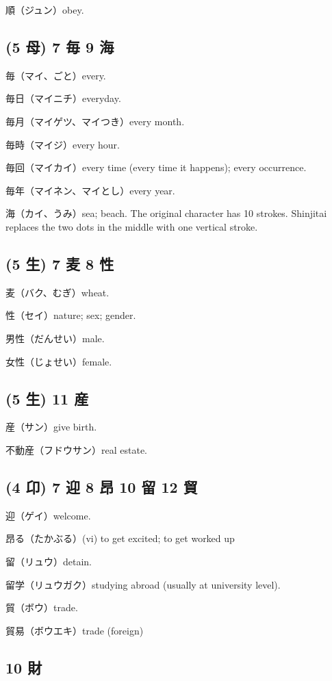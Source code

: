 順（ジュン）obey.

\subsection{(5 母) 7 毎 9 海}

毎（マイ、ごと）every.

毎日（マイニチ）everyday.

毎月（マイゲツ、マイつき）every month.

毎時（マイジ）every hour.

毎回（マイカイ）every time (every time it happens); every occurrence.

毎年（マイネン、マイとし）every year.

海（カイ、うみ）sea; beach.
The original character has 10 strokes.
Shinjitai replaces the two dots in the middle
with one vertical stroke.

\subsection{(5 生) 7 麦 8 性}

麦（バク、むぎ）wheat.

性（セイ）nature; sex; gender.

男性（だんせい）male.

女性（じょせい）female.

\subsection{(5 生) 11 産}

産（サン）give birth.

不動産（フドウサン）real estate.

\subsection{(4 卬) 7 迎 8 昂 10 留 12 貿}

迎（ゲイ）welcome.

昂る（たかぶる）(vi) to get excited; to get worked up

留（リュウ）detain.

留学（リュウガク）studying abroad (usually at university level).

貿（ボウ）trade.

貿易（ボウエキ）trade (foreign)

\subsection{10 財}

